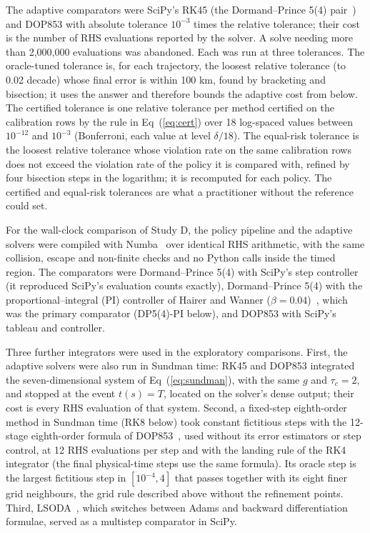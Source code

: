 \documentclass[10pt,letterpaper]{article}
\begin{document}
The adaptive comparators were SciPy's RK45 (the Dormand--Prince 5(4) pair~\cite{dormand1980}) and DOP853 with absolute tolerance $10^{-3}$ times the relative tolerance; their cost is the number of RHS evaluations reported by the solver. A solve needing more than 2,000,000 evaluations was abandoned. Each was run at three tolerances. The oracle-tuned tolerance is, for each trajectory, the loosest relative tolerance (to 0.02 decade) whose final error is within 100 km, found by bracketing and bisection; it uses the answer and therefore bounds the adaptive cost from below. The certified tolerance is one relative tolerance per method certified on the calibration rows by the rule in Eq~(\ref{eq:cert}) over 18 log-spaced values between $10^{-12}$ and $10^{-3}$ (Bonferroni, each value at level $\delta/18$). The equal-risk tolerance is the loosest relative tolerance whose violation rate on the same calibration rows does not exceed the violation rate of the policy it is compared with, refined by four bisection steps in the logarithm; it is recomputed for each policy. The certified and equal-risk tolerances are what a practitioner without the reference could set.

For the wall-clock comparison of Study D, the policy pipeline and the adaptive solvers were compiled with Numba~\cite{lam2015} over identical RHS arithmetic, with the same collision, escape and non-finite checks and no Python calls inside the timed region. The comparators were Dormand--Prince 5(4) with SciPy's step controller (it reproduced SciPy's evaluation counts exactly), Dormand--Prince 5(4) with the proportional--integral (PI) controller of Hairer and Wanner ($\beta = 0.04$)~\cite{hairer1993,gustafsson1988}, which was the primary comparator (DP5(4)-PI below), and DOP853 with SciPy's tableau and controller.

Three further integrators were used in the exploratory comparisons. First, the adaptive solvers were also run in Sundman time: RK45 and DOP853 integrated the seven-dimensional system of Eq~(\ref{eq:sundman}), with the same $g$ and $\tau_{c} = 2$, and stopped at the event $t(s) = T$, located on the solver's dense output; their cost is every RHS evaluation of that system. Second, a fixed-step eighth-order method in Sundman time (RK8 below) took constant fictitious steps with the 12-stage eighth-order formula of DOP853~\cite{hairer1993,prince1981}, used without its error estimators or step control, at 12 RHS evaluations per step and with the landing rule of the RK4 integrator (the final physical-time steps use the same formula). Its oracle step is the largest fictitious step in $[10^{-4}, 4]$ that passes together with its eight finer grid neighbours, the grid rule described above without the refinement points. Third, LSODA~\cite{petzold1983}, which switches between Adams and backward differentiation formulae, served as a multistep comparator in SciPy.
\end{document}
